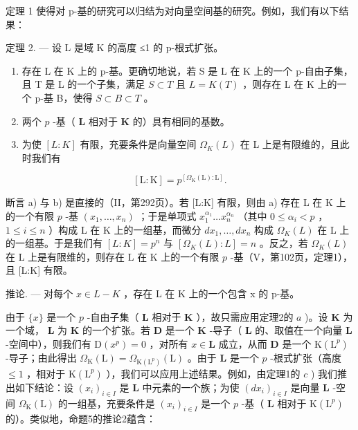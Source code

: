 定理 1 使得对 p-基的研究可以归结为对向量空间基的研究。例如，我们有以下结果：

定理 2. --- 设 L 是域 K 的高度 ≤1 的 p-根式扩张。

\begin{enumerate}
\def\labelenumi{\alph{enumi})}
\item
  存在 L 在 K 上的 p-基。更确切地说，若 S 是 L 在 K 上的一个 p-自由子集，且 T 是 L 的一个子集，满足 \(S \subset T\) 且 \(L = K(T)\) ，则存在 L 在 K 上的一个 p-基 B，使得 \(S \subset B \subset T\) 。
\item
  两个 \(p\) -基（ \(\mathbf{L}\) 相对于 \(\mathbf{K}\) 的）具有相同的基数。
\item
  为使 \([L:K]\) 有限，充要条件是向量空间 \(\Omega_{K}(L)\) 在 L 上是有限维的，且此时我们有
\end{enumerate}

\[
[ \mathrm{L}: \mathrm{K} ] = p ^ {[ \Omega_ {\mathrm{K}} (\mathrm{L}): \mathrm{L} ]}.\tag{5}
\]

断言 a) 与 b) 是直接的（II，第292页）。若 {[}L:K{]} 有限，则由 a) 存在 L 在 K 上的一个有限 \(p\) -基 \((x_1, \ldots, x_n)\) ；于是单项式 \(x_1^{\alpha_1} \ldots x_n^{\alpha_n}\) （其中 \(0 \leqslant \alpha_i < p\) ， \(1 \leqslant i \leqslant n\) ）构成 L 在 K 上的一组基，而微分 \(dx_1, \ldots, dx_n\) 构成 \(\Omega_K(L)\) 在 L 上的一组基。于是我们有 \([L:K] = p^n\) 与 \([\Omega_K(L):L] = n\) 。反之，若 \(\Omega_K(L)\) 在 L 上是有限维的，则存在 L 在 K 上的一个有限 \(p\) -基（V，第102页，定理1），且 {[}L:K{]} 有限。

推论. --- 对每个 \(x \in L - K\) ，存在 L 在 K 上的一个包含 x 的 p-基。

由于 \(\{x\}\) 是一个 \(p\) -自由子集（ \(\mathbf{L}\) 相对于 \(\mathbf{K}\) ），故只需应用定理2的 \(a\) )。设 \(\mathbf{K}\) 为一个域， \(\mathbf{L}\) 为 \(\mathbf{K}\) 的一个扩张。若 \(\mathbf{D}\) 是一个 \(\mathbf{K}\) -导子（ \(\mathbf{L}\) 的、取值在一个向量 \(\mathbf{L}\) -空间中），则我们有 \(\mathrm{D}(x^p) = 0\) ，对所有 \(x \in \mathbf{L}\) 成立，从而 \(\mathbf{D}\) 是一个 \(\mathrm{K}(\mathrm{L}^p)\) -导子；由此得出 \(\Omega_{\mathrm{K}}(\mathrm{L}) = \Omega_{\mathrm{K}(\mathrm{L}^p)}(\mathrm{L})\) 。由于 \(\mathbf{L}\) 是一个 \(p\) -根式扩张（高度 \(\leqslant 1\) ，相对于 \(\mathrm{K}(\mathrm{L}^p)\) ），我们可以应用上述结果。例如，由定理1的 \(c\) ) 我们推出如下结论：设 \((x_i)_{i \in I}\) 是 \(\mathbf{L}\) 中元素的一个族；为使 \((dx_i)_{i \in I}\) 是向量 \(\mathbf{L}\) -空间 \(\Omega_{\mathrm{K}}(\mathrm{L})\) 的一组基，充要条件是 \((x_i)_{i \in I}\) 是一个 \(p\) -基（ \(\mathbf{L}\) 相对于 \(\mathrm{K}(\mathrm{L}^p)\) 的）。类似地，命题5的推论2蕴含：

